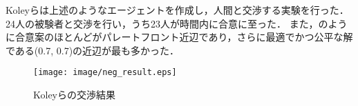 Koleyらは上述のようなエージェントを作成し，人間と交渉する実験を行った．
24人の被験者と交渉を行い，うち23人が時間内に合意に至った．
また，のように合意案のほとんどがパレートフロント近辺であり，さらに最適でかつ公平な解である(0.7, 0.7)の近辺が最も多かった．
\begin{figure}[htb]
    \centering
    \texttt{[image: image/neg\_result.eps]}
    \caption{Koleyらの交渉結果 \protect \footnotemark}
    \label{fig:koley_result}
\end{figure}

